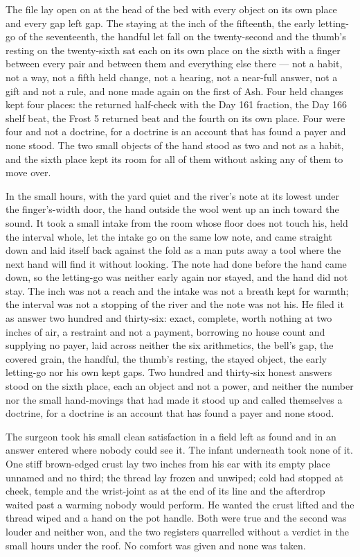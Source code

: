 The file lay open on  at the head of the bed with every object on its own place and every gap left gap. The staying at the inch of the fifteenth, the early letting-go of the seventeenth, the handful let fall on the twenty-second and the thumb's resting on the twenty-sixth sat each on its own place on the sixth with a finger between every pair and between them and everything else there --- not a habit, not a way, not a fifth held change, not a hearing, not a near-full answer, not a gift and not a rule, and none made again on the first of Ash. Four held changes kept four places: the returned half-check with the Day 161 fraction, the Day 166 shelf beat, the Frost 5 returned beat and the fourth on its own place. Four were four and not a doctrine, for a doctrine is an account that has found a payer and none stood. The two small objects of the hand stood as two and not as a habit, and the sixth place kept its room for all of them without asking any of them to move over.

In the small hours, with the yard quiet and the river's note at its lowest under the finger's-width door, the hand outside the wool went up an inch toward the sound. It took a small intake from the room whose floor does not touch his, held the interval whole, let the intake go on the same low note, and came straight down and laid itself back against the fold as a man puts away a tool where the next hand will find it without looking. The note had done before the hand came down, so the letting-go was neither early again nor stayed, and the hand did not stay. The inch was not a reach and the intake was not a breath kept for warmth; the interval was not a stopping of the river and the note was not his. He filed it as answer two hundred and thirty-six: exact, complete, worth nothing at two inches of air, a restraint and not a payment, borrowing no house count and supplying no payer, laid across neither the six arithmetics, the bell's gap, the covered grain, the handful, the thumb's resting, the stayed object, the early letting-go nor his own kept gaps. Two hundred and thirty-six honest answers stood on the sixth place, each an object and not a power, and neither the number nor the small hand-movings that had made it stood up and called themselves a doctrine, for a doctrine is an account that has found a payer and none stood.

The surgeon took his small clean satisfaction in a field left as found and in an answer entered where nobody could see it. The infant underneath took none of it. One stiff brown-edged crust lay two inches from his ear with its empty place unnamed and no third; the thread lay frozen and unwiped; cold had stopped at cheek, temple and the wrist-joint as at the end of its line and the afterdrop waited past a warming nobody would perform. He wanted the crust lifted and the thread wiped and a hand on the pot handle. Both were true and the second was louder and neither won, and the two registers quarrelled without a verdict in the small hours under the roof. No comfort was given and none was taken.

